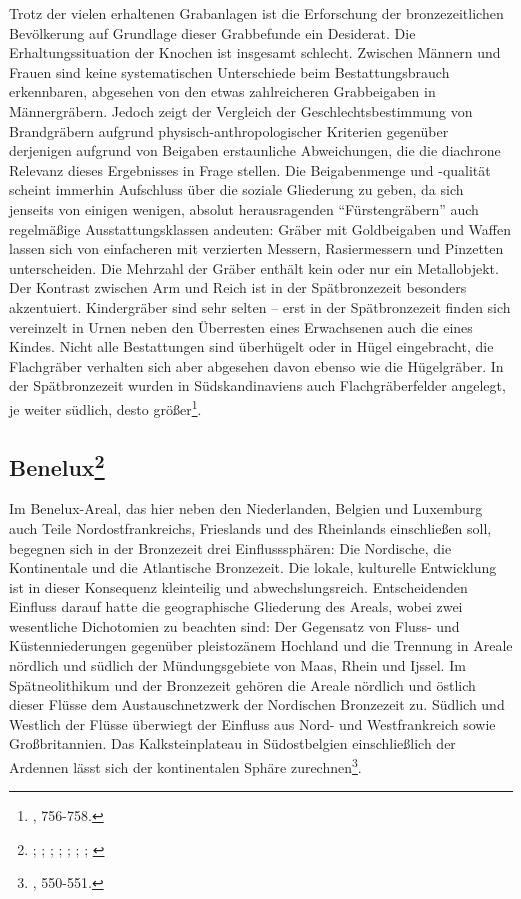 \documentclass[openany,twoside,twocolumn]{book}
\let\rmarkdownfootnote\footnote%
\def\footnote{\protect\rmarkdownfootnote}
\begin{document}
Trotz der vielen erhaltenen Grabanlagen ist die Erforschung der
bronzezeitlichen Bevölkerung auf Grundlage dieser Grabbefunde ein
Desiderat. Die Erhaltungssituation der Knochen ist insgesamt schlecht.
Zwischen Männern und Frauen sind keine systematischen Unterschiede beim
Bestattungsbrauch erkennbaren, abgesehen von den etwas zahlreicheren
Grabbeigaben in Männergräbern. Jedoch zeigt der Vergleich der
Geschlechtsbestimmung von Brandgräbern aufgrund
physisch-anthropologischer Kriterien gegenüber derjenigen aufgrund von
Beigaben erstaunliche Abweichungen, die die diachrone Relevanz dieses
Ergebnisses in Frage stellen. Die Beigabenmenge und -qualität scheint
immerhin Aufschluss über die soziale Gliederung zu geben, da sich
jenseits von einigen wenigen, absolut herausragenden ``Fürstengräbern''
auch regelmäßige Ausstattungsklassen andeuten: Gräber mit Goldbeigaben
und Waffen lassen sich von einfacheren mit verzierten Messern,
Rasiermessern und Pinzetten unterscheiden. Die Mehrzahl der Gräber
enthält kein oder nur ein Metallobjekt. Der Kontrast zwischen Arm und
Reich ist in der Spätbronzezeit besonders akzentuiert. Kindergräber sind
sehr selten -- erst in der Spätbronzezeit finden sich vereinzelt in
Urnen neben den Überresten eines Erwachsenen auch die eines Kindes.
Nicht alle Bestattungen sind überhügelt oder in Hügel eingebracht, die
Flachgräber verhalten sich aber abgesehen davon ebenso wie die
Hügelgräber. In der Spätbronzezeit wurden in Südskandinaviens auch
Flachgräberfelder angelegt, je weiter südlich, desto größer\footnote{\textcite{thrane_scandinavia_2013},
  756-758.}.

\hypertarget{benelux}{%
\subsection[Benelux]{\texorpdfstring{Benelux\footnote{\textcite{beek_circles_2014};
  \textcite{bourgeois_bronze_2008}; \textcite{drenth_mounds_2005};
  \textcite{fokkens_bronze_2013}; \textcite{fontijn_sacrificial_2002};
  \textcite{de_reu_land_2012}; \textcite{lohof_grafritueel_1991};
  \textcite{lohof_tradition_1994}}}{Benelux}}\label{benelux}}

Im Benelux-Areal, das hier neben den Niederlanden, Belgien und Luxemburg
auch Teile Nordostfrankreichs, Frieslands und des Rheinlands
einschließen soll, begegnen sich in der Bronzezeit drei Einflusssphären:
Die Nordische, die Kontinentale und die Atlantische Bronzezeit. Die
lokale, kulturelle Entwicklung ist in dieser Konsequenz kleinteilig und
abwechslungsreich. Entscheidenden Einfluss darauf hatte die
geographische Gliederung des Areals, wobei zwei wesentliche Dichotomien
zu beachten sind: Der Gegensatz von Fluss- und Küstenniederungen
gegenüber pleistozänem Hochland und die Trennung in Areale nördlich und
südlich der Mündungsgebiete von Maas, Rhein und Ijssel. Im
Spätneolithikum und der Bronzezeit gehören die Areale nördlich und
östlich dieser Flüsse dem Austauschnetzwerk der Nordischen Bronzezeit
zu. Südlich und Westlich der Flüsse überwiegt der Einfluss aus Nord- und
Westfrankreich sowie Großbritannien. Das Kalksteinplateau in
Südostbelgien einschließlich der Ardennen lässt sich der kontinentalen
Sphäre zurechnen\footnote{\textcite{fokkens_bronze_2013}, 550-551.}.
\end{document}
